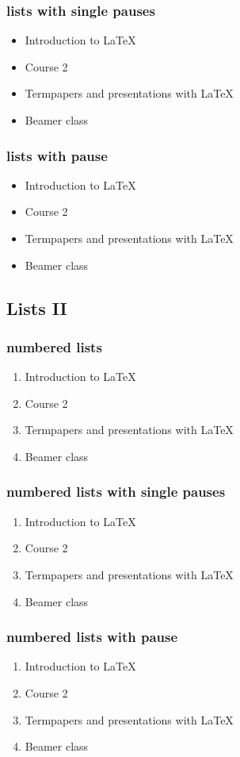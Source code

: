 \documentclass[hyperref={pdfpagelabels=false}]{beamer}
\theoremstyle{remark}
\begin{document}
\begin{frame}\frametitle{lists with single pauses}
\begin{itemize}
\item Introduction to  \LaTeX{}  \pause 
\item Course 2 \pause 
\item Termpapers and presentations with \LaTeX{}  \pause 
\item Beamer class
\end{itemize} 
\end{frame}

\begin{frame}\frametitle{lists with pause}
\begin{itemize}[<+->]
\item Introduction to  \LaTeX{}  
\item Course 2
\item Termpapers and presentations with \LaTeX{}  
\item Beamer class
\end{itemize} 
\end{frame}



\subsection{Lists II}
\begin{frame}\frametitle{numbered lists}
\begin{enumerate}
\item Introduction to  \LaTeX{}   
\item Course 2 
\item Termpapers and presentations with \LaTeX{}  
\item Beamer class
\end{enumerate}
\end{frame}

\begin{frame}
\frametitle{numbered lists with single pauses}
\begin{enumerate}
\item Introduction to  \LaTeX{}  \pause 
\item Course 2 \pause 
\item Termpapers and presentations with \LaTeX{}  \pause 
\item Beamer class
\end{enumerate}
\end{frame}

\begin{frame}
\frametitle{numbered lists with pause}
\begin{enumerate}[<+->]
\item Introduction to  \LaTeX{}  
\item Course 2
\item Termpapers and presentations with \LaTeX{}  
\item Beamer class
\end{enumerate}
\end{frame}
\end{document}
